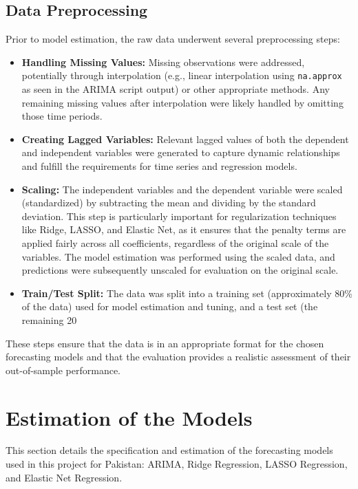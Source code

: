 \documentclass[12pt,a4paper]{article}
\begin{document}
\subsection{Data Preprocessing}
Prior to model estimation, the raw data underwent several preprocessing steps:
\begin{itemize}
    \item \textbf{Handling Missing Values:} Missing observations were addressed, potentially through interpolation (e.g., linear interpolation using \texttt{na.approx} as seen in the ARIMA script output) or other appropriate methods. Any remaining missing values after interpolation were likely handled by omitting those time periods.
    \item \textbf{Creating Lagged Variables:} Relevant lagged values of both the dependent and independent variables were generated to capture dynamic relationships and fulfill the requirements for time series and regression models.
    \item \textbf{Scaling:} The independent variables and the dependent variable were scaled (standardized) by subtracting the mean and dividing by the standard deviation. This step is particularly important for regularization techniques like Ridge, LASSO, and Elastic Net, as it ensures that the penalty terms are applied fairly across all coefficients, regardless of the original scale of the variables. The model estimation was performed using the scaled data, and predictions were subsequently unscaled for evaluation on the original scale.
    \item \textbf{Train/Test Split:} The data was split into a training set (approximately 80\% of the data) used for model estimation and tuning, and a test set (the remaining 20%
\end{itemize}
These steps ensure that the data is in an appropriate format for the chosen forecasting models and that the evaluation provides a realistic assessment of their out-of-sample performance.

\section{Estimation of the Models}

This section details the specification and estimation of the forecasting models used in this project for Pakistan: ARIMA, Ridge Regression, LASSO Regression, and Elastic Net Regression.
\end{document}
